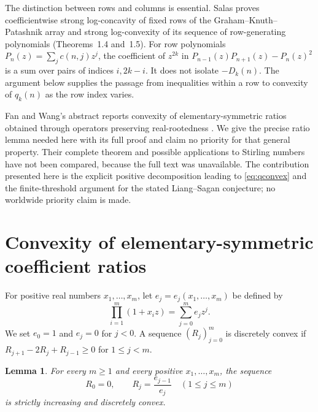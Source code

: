 \documentclass[11pt,a4paper]{article}
\newtheorem{lemma}[theorem]{Lemma}
\theoremstyle{remark}
\newcommand{\D}{D_k}
\begin{document}
The distinction between rows and columns is essential. Salas proves
coefficientwise strong log-concavity of fixed rows of the
Graham--Knuth--Patashnik array and strong log-convexity of its sequence of
row-generating polynomials \cite{Salas2026} (Theorems~1.4 and~1.5).
For row polynomials $P_n(z)=\sum_j c(n,j)z^j$, the coefficient of $z^{2k}$
in $P_{n-1}(z)P_{n+1}(z)-P_n(z)^2$ is a sum over pairs of indices
$i,2k-i$. It does not isolate $-\D(n)$. The argument below supplies the
passage from inequalities within a row to convexity of $q_k(n)$ as the row
index varies.

Fan and Wang's abstract reports convexity of elementary-symmetric ratios
obtained through operators preserving real-rootedness \cite{FanWang2026}.
We give the precise ratio lemma needed here with its full proof and claim
no priority for that general property. Their complete theorem and possible
applications to Stirling numbers have not been compared, because the full
text was unavailable. The contribution presented here is the explicit
positive decomposition leading to \eqref{eq:qconvex} and the finite-threshold
argument for the stated Liang--Sagan conjecture; no worldwide priority
claim is made.

\section{Convexity of elementary-symmetric coefficient ratios}

For positive real numbers $x_1,\ldots,x_m$, let $e_j=e_j(x_1,\ldots,x_m)$
be defined by
\[
 \prod_{i=1}^m(1+x_i z)=\sum_{j=0}^m e_jz^j.
\]
We set $e_0=1$ and $e_j=0$ for $j<0$. A sequence $(R_j)_{j=0}^m$ is
discretely convex if $R_{j+1}-2R_j+R_{j-1}\geq0$ for $1\leq j<m$.

\begin{lemma}\label{lem:ratios}
For every $m\geq1$ and every positive $x_1,\ldots,x_m$, the sequence
\[
 R_0=0,\qquad R_j=\frac{e_{j-1}}{e_j}\quad(1\leq j\leq m)
\]
is strictly increasing and discretely convex.
\end{lemma}
\end{document}
